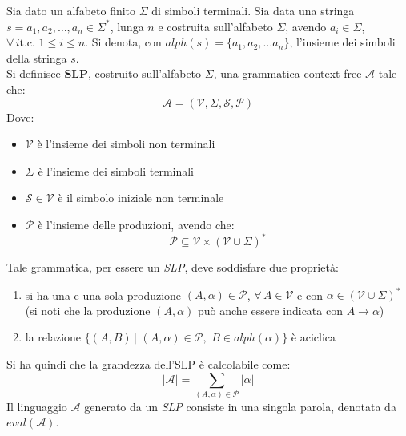 \begin{definizione}
  Sia dato un alfabeto finito $\Sigma$ di simboli terminali. Sia data una
  stringa $s=a_1,a_2,\ldots, a_n\in\Sigma^{*}$, lunga $n$ e costruita
  sull'alfabeto $\Sigma$, avendo $a_i\in\Sigma$, $\forall\, i \mbox{
    t.c. }1\leq i\leq n$. Si denota, con $alph(s)=\{a_1,a_2,\ldots
  a_n\}$, l'insieme dei simboli della stringa $s$.\\
  Si definisce \textbf{SLP}, costruito sull'alfabeto $\Sigma$, una grammatica
  context-free $\mathcal{A}$ tale che: 
  \begin{equation}
    \label{eq:slpdef}
    \mathcal{A}=\left(\mathcal{V}, \Sigma, \mathcal{S}, \mathcal{P}\right)
  \end{equation}
  Dove:
  \begin{itemize}
    \item $\mathcal{V}$ è l'insieme dei simboli non terminali
    \item $\Sigma$ è l'insieme dei simboli terminali
    \item $\mathcal{S}\in \mathcal{V}$ è il simbolo iniziale non terminale
    \item $\mathcal{P}$ è l'insieme delle produzioni, avendo che:
    \begin{equation}
      \label{eq:slpprod}
      \mathcal{P}\subseteq \mathcal{V}\times\left(\mathcal{V}\cup
        \Sigma\right)^{*}
    \end{equation}
  \end{itemize}
  Tale grammatica, per essere un \textit{SLP}, deve soddisfare due proprietà:
  \begin{enumerate}
    \item si ha una e una sola produzione $(A,\alpha)\in \mathcal{P}$,
    $\forall\, A\in \mathcal{V}$ e con $\alpha\in
    \left(\mathcal{V}\cup\Sigma\right)^{*}$ (si 
    noti che la produzione $(A,\alpha)$ può anche essere indicata con
    $A\to\alpha$) 
    \item la relazione $\{(A,B)\,|\,\,(A,\alpha)\in\mathcal{P},\,\,B\in
    alph(\alpha)\}$ è aciclica
  \end{enumerate}
  Si ha quindi che la grandezza dell'SLP è calcolabile come:
  \begin{equation}
    \label{eq:slplen}
    |\mathcal{A}| = \sum_{(A,\alpha)\in\mathcal{P}}|\alpha|
  \end{equation}
  Il linguaggio $\mathcal{A}$ generato da un \textit{SLP}
  consiste in una singola parola, denotata da $eval(\mathcal{A})$.
\end{definizione}
